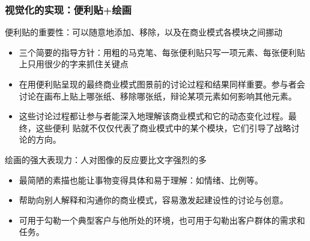 \subsubsection{视觉化的实现：便利贴+绘画}
便利贴的重要性：可以随意地添加、移除，以及在商业模式各模块之间挪动
\begin{itemize}
    \item 三个简要的指导方针：用粗的马克笔、每张便利贴只写一项元素、每张便利贴上只用很少的字来抓住关键点
    \item 在用便利贴呈现的最终商业模式图景前的讨论过程和结果同样重要。参与者会讨论在画布上贴上哪张纸、移除哪张纸，辩论某项元素如何影响其他元素。
    \item 这些讨论过程都让参与者能深入地理解该商业模式和它的动态变化过程。最终，这些便利 贴就不仅仅代表了商业模式中的某个模块，它们引导了战略讨论的方向。   
\end{itemize}

绘画的强大表现力：人对图像的反应要比文字强烈的多
\begin{itemize}
    \item 最简陋的素描也能让事物变得具体和易于理解：如情绪、比例等。
    \item 帮助向别人解释和沟通你的商业模式，容易激发起建设性的讨论与创意。
    \item 可用于勾勒一个典型客户与他所处的环境，也可用于勾勒出客户群体的需求和任务。
\end{itemize}


